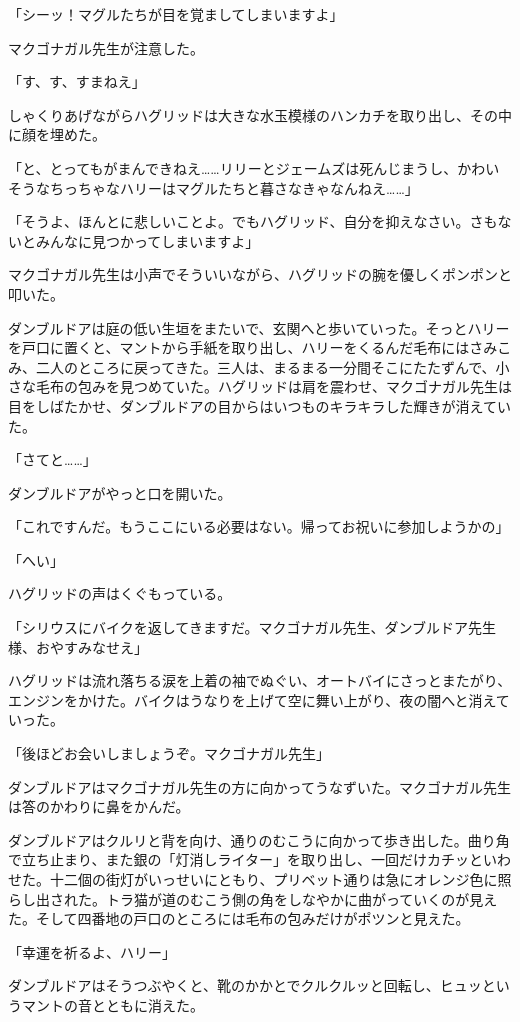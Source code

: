 \documentclass[10pt,a4paper]{article}
\begin{document}
\begin{CJK}{UTF8}{min}
「シーッ！マグルたちが目を覚ましてしまいますよ」

マクゴナガル先生が注意した。

「す、す、すまねえ」

しゃくりあげながらハグリッドは大きな水玉模様のハンカチを取り出し、その中に顔を埋めた。

「と、とってもがまんできねえ……リリーとジェームズは死んじまうし、かわいそうなちっちゃなハリーはマグルたちと暮さなきゃなんねえ……」

「そうよ、ほんとに悲しいことよ。でもハグリッド、自分を抑えなさい。さもないとみんなに見つかってしまいますよ」

マクゴナガル先生は小声でそういいながら、ハグリッドの腕を優しくポンポンと叩いた。

ダンブルドアは庭の低い生垣をまたいで、玄関へと歩いていった。そっとハリーを戸口に置くと、マントから手紙を取り出し、ハリーをくるんだ毛布にはさみこみ、二人のところに戻ってきた。三人は、まるまる一分間そこにたたずんで、小さな毛布の包みを見つめていた。ハグリッドは肩を震わせ、マクゴナガル先生は目をしばたかせ、ダンブルドアの目からはいつものキラキラした輝きが消えていた。

「さてと……」

ダンブルドアがやっと口を開いた。

「これですんだ。もうここにいる必要はない。帰ってお祝いに参加しようかの」

「へい」

ハグリッドの声はくぐもっている。

「シリウスにバイクを返してきますだ。マクゴナガル先生、ダンブルドア先生様、おやすみなせえ」

ハグリッドは流れ落ちる涙を上着の袖でぬぐい、オートバイにさっとまたがり、エンジンをかけた。バイクはうなりを上げて空に舞い上がり、夜の闇へと消えていった。

「後ほどお会いしましょうぞ。マクゴナガル先生」

ダンブルドアはマクゴナガル先生の方に向かってうなずいた。マクゴナガル先生は答のかわりに鼻をかんだ。

ダンブルドアはクルリと背を向け、通りのむこうに向かって歩き出した。曲り角で立ち止まり、また銀の「灯消しライター」を取り出し、一回だけカチッといわせた。十二個の街灯がいっせいにともり、プリベット通りは急にオレンジ色に照らし出された。トラ猫が道のむこう側の角をしなやかに曲がっていくのが見えた。そして四番地の戸口のところには毛布の包みだけがポツンと見えた。

「幸運を祈るよ、ハリー」

ダンブルドアはそうつぶやくと、靴のかかとでクルクルッと回転し、ヒュッというマントの音とともに消えた。




\end{CJK}
\end{document}
